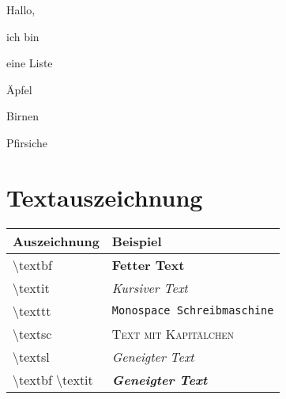 \begin{compactenum}
\item Hallo,
\item ich bin
\item eine Liste
\end{compactenum}

\begin{compactdesc}
\item[Äpfel] \blindtext
\item[Birnen] \blindtext
\item[Pfirsiche] \blindtext
\end{compactdesc}

\section{Textauszeichnung}

\begin{tabular}{ll} \toprule
Auszeichnung & Beispiel \\ \midrule
\textbackslash textbf & \textbf{Fetter Text} \\
\textbackslash textit & \textit{Kursiver Text} \\
\textbackslash texttt & \texttt{Monospace Schreibmaschine} \\
\textbackslash textsc & \textsc{Text mit Kapitälchen} \\
\textbackslash textsl & \textsl{Geneigter Text} \\
\textbackslash textbf  \textbackslash textit  & \textit{\bfseries Geneigter Text} \\
\end{tabular}



